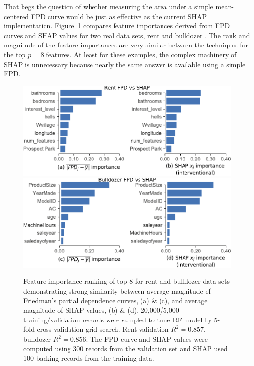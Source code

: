 \documentclass[11pt]{article}
\newcommand{\figref}[1]{Figure~\ref{#1}}
\begin{document}
That begs the question of whether measuring the area under a simple mean-centered FPD curve would be just as effective as the current SHAP implementation.  \figref{fig:fpd_imp} compares feature importances derived from FPD curves and SHAP values for two real data sets, rent \cite{rent} and bulldozer \cite{bulldozer}. The rank and magnitude of the feature importances are very similar between the techniques for the top  $p=8$ features. At least for these examples, the complex machinery of SHAP is unnecessary because nearly the same answer is available using a simple FPD. 

\begin{figure}[htbp]
\begin{center}
\includegraphics[scale=0.53]{images/rent-pdp-vs-shap.pdf}\includegraphics[scale=0.53]{images/bulldozer-pdp-vs-shap.pdf}\\
\vspace{-3mm}
\caption[short]{\small  Feature importance ranking of top 8 for rent and bulldozer data sets demonstrating strong similarity between average magnitude of Friedman's partial dependence curves, (a) \& (c), and average magnitude of SHAP values, (b) \& (d). 20,000/5,000 training/validation records were sampled to tune RF model by 5-fold cross validation grid search. Rent validation $R^2 = 0.857$, bulldozer $R^2 = 0.856$. The FPD curve and SHAP values were computed using 300 records from the validation set and SHAP used 100 backing records from the training data.}
\label{fig:fpd_imp}
\end{center}
\end{figure}
\end{document}
